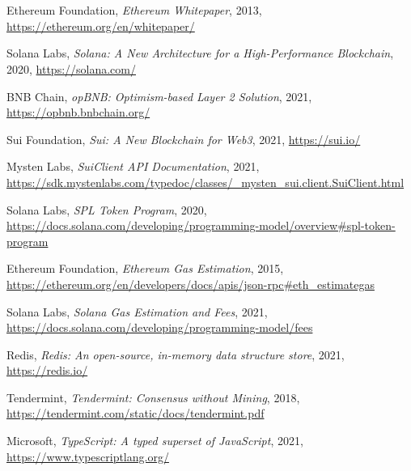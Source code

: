 \documentclass{article}
\begin{document}
\section*{}
\begin{thebibliography}{9}

Ethereum Foundation, \textit{Ethereum Whitepaper}, 2013, \url{https://ethereum.org/en/whitepaper/}

Solana Labs, \textit{Solana: A New Architecture for a High-Performance Blockchain}, 2020, \url{https://solana.com/}

BNB Chain, \textit{opBNB: Optimism-based Layer 2 Solution}, 2021, \url{https://opbnb.bnbchain.org/}

Sui Foundation, \textit{Sui: A New Blockchain for Web3}, 2021, \url{https://sui.io/}

Mysten Labs, \textit{SuiClient API Documentation}, 2021, \url{https://sdk.mystenlabs.com/typedoc/classes/_mysten_sui.client.SuiClient.html}

Solana Labs, \textit{SPL Token Program}, 2020, \url{https://docs.solana.com/developing/programming-model/overview#spl-token-program}

Ethereum Foundation, \textit{Ethereum Gas Estimation}, 2015, \url{https://ethereum.org/en/developers/docs/apis/json-rpc#eth_estimategas}

Solana Labs, \textit{Solana Gas Estimation and Fees}, 2021, \url{https://docs.solana.com/developing/programming-model/fees}

Redis, \textit{Redis: An open-source, in-memory data structure store}, 2021, \url{https://redis.io/}

Tendermint, \textit{Tendermint: Consensus without Mining}, 2018, \url{https://tendermint.com/static/docs/tendermint.pdf}

Microsoft, \textit{TypeScript: A typed superset of JavaScript}, 2021, \url{https://www.typescriptlang.org/}

\end{thebibliography}
\end{document}
